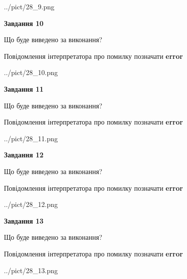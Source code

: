 \documentclass[11pt, ukrainian]{article}
\begin{document}
{\begin {large}
\begin{center}
	{../pict/28_9.png}
\end{center}
\newpage

{\begin {center}\textbf{Завдання 10}\end {center}}\par
Що буде виведено за виконання? \par
Повідомлення інтерпретатора про помилку позначати \textbf{error}

\begin{center}
	{../pict/28_10.png}
\end{center}
\newpage

{\begin {center}\textbf{Завдання 11}\end {center}}\par
Що буде виведено за виконання? \par
Повідомлення інтерпретатора про помилку позначати \textbf{error}

\begin{center}
	{../pict/28_11.png}
\end{center}
\newpage

{\begin {center}\textbf{Завдання 12}\end {center}}\par
Що буде виведено за виконання? \par
Повідомлення інтерпретатора про помилку позначати \textbf{error}

\begin{center}
	{../pict/28_12.png}
\end{center}
\newpage

{\begin {center}\textbf{Завдання 13}\end {center}}\par
Що буде виведено за виконання? \par
Повідомлення інтерпретатора про помилку позначати \textbf{error}

\begin{center}
	{../pict/28_13.png}
\end{center}
\newpage


\end{large}}
\end{document}
